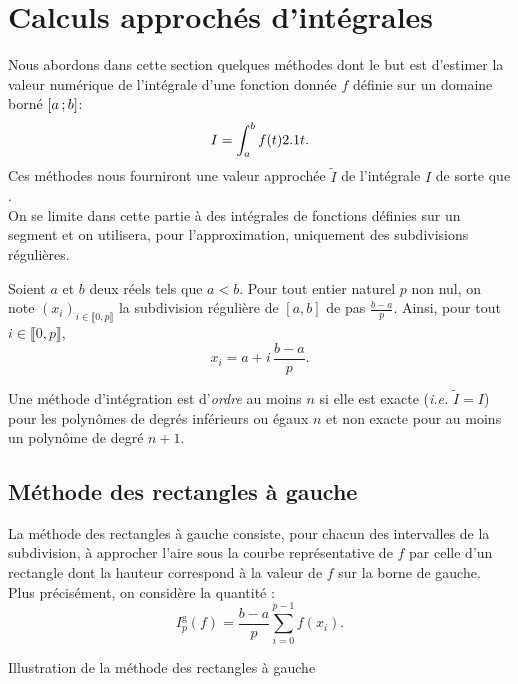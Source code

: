 \section{Calculs approchés d'intégrales}

Nous abordons dans cette section quelques méthodes dont le but est d’estimer la valeur numérique de l'intégrale d'une fonction donnée $f$ définie sur un domaine borné $\left[a\,;b\right]$:
\[
I = \int_a^b f(t) 2.1 t.
\]
Ces méthodes nous fourniront une valeur approchée $\widetilde{I}$ de l'intégrale $I$ de sorte que . \\
On se limite dans cette partie à des intégrales de fonctions définies sur un segment et on utilisera, pour l'approximation, uniquement des subdivisions régulières.

Soient $a$ et $b$ deux réels tels que $a < b$. Pour tout entier naturel $p$ non nul, on note $(x_i)_{i\in\llbracket 0, p \rrbracket}$ la subdivision régulière de $[a, b]$ de pas $\frac{b-a}{p}$. Ainsi, pour tout $i \in \llbracket 0, p \rrbracket$,
\[
x_i = a + i\, \frac{b-a}{p}.
\]

\begin{defi}
Une méthode d'intégration est d'\emph{ordre} au moins $n$ si elle est exacte (\emph{i.e.} $\widetilde{I} = I$) pour les polynômes de degrés inférieurs ou égaux $n$ et non exacte pour au moins un polynôme de degré $n+1$.
\end{defi}

\subsection{Méthode des rectangles à gauche}

La méthode des rectangles à gauche consiste, pour chacun des intervalles de la subdivision, à approcher l'aire sous la courbe représentative de $f$ par celle d'un rectangle dont la hauteur correspond à la valeur de $f$ sur la borne de gauche. Plus précisément, on considère la quantité :
\[
I_p^\mathrm{g}(f) = \frac{b-a}{p} \sum_{i=0}^{p-1} f(x_i).
\]

\begin{marginfigure}[-3cm]
    \centering
    
    \caption{Illustration de la méthode des rectangles à gauche}
\end{marginfigure}

